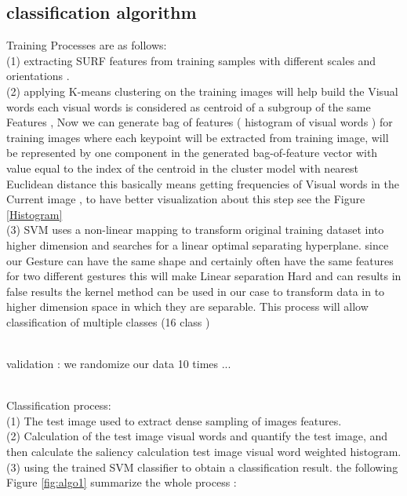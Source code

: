 \subsection{classification algorithm }

Training Processes are as follows:\\ (1) extracting SURF
features from training samples with different
scales and  orientations .
\\ (2)  applying  K-means clustering on the training images will help build the Visual words each visual words is considered as centroid of a subgroup of the same Features , Now we can generate bag of features ( histogram of visual words ) for training images where each keypoint will be extracted from training image,
will be represented by one component in the generated
bag-of-feature vector with value equal to the index of the
centroid in the cluster model with nearest Euclidean
distance this basically means getting frequencies of Visual words in the Current image , to have better visualization  about this step see the Figure \ref{Histogram} \\ (3)  SVM uses a non-linear mapping to transform original training dataset into higher dimension and searches for a linear optimal
separating hyperplane. since our Gesture can have the same shape and certainly often have the same features for two different gestures  this will make Linear separation Hard and can results in false results the kernel method can be used in our case  to transform data  in to higher dimension space in which they are separable. This process will allow classification of multiple classes (16 class ) 

\\validation :
we randomize our data 10 times ...


\\ Classiﬁcation
process:\\ (1) The test image used to extract dense sampling of
images features. \\(2) Calculation of the test image visual words
and quantify the test image, and then calculate the saliency
calculation test image visual word weighted histogram.\\ (3)
using the trained SVM classiﬁer to obtain a classiﬁcation
result.
the following Figure \ref{fig:algo1}  summarize the whole  process :

